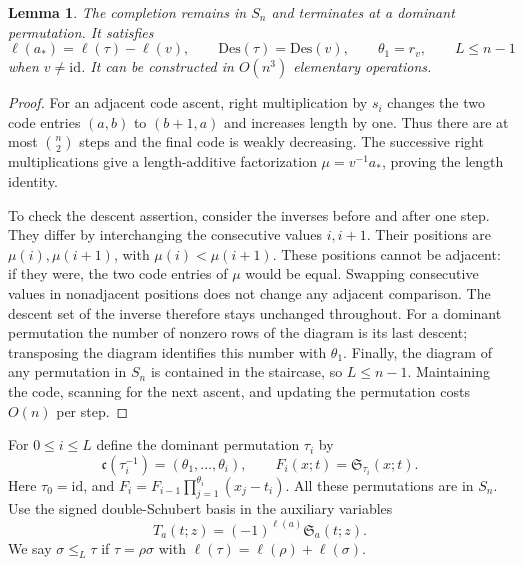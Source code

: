 \documentclass{amsart}
\newtheorem{lemma}[theorem]{Lemma}
\theoremstyle{definition}
\theoremstyle{remark}
\numberwithin{equation}{section}
\newcommand{\Sch}{\mathfrak S}
\newcommand{\code}{\mathfrak c}
\newcommand{\id}{\mathrm{id}}
\newcommand{\Des}{\mathrm{Des}}
\begin{document}
\begin{lemma}\label{lem:completion}
The completion remains in $S_n$ and terminates at a dominant permutation.
It satisfies
\[
 \ell(a_*)=\ell(\tau)-\ell(v),\qquad
 \Des(\tau)=\Des(v),\qquad
 \theta_1=r_v,\qquad L\leq n-1
\]
when $v\ne\id$.
It can be constructed in $O(n^3)$ elementary operations.
\end{lemma}
\begin{proof}
For an adjacent code ascent, right multiplication by $s_i$ changes
the two code entries $(a,b)$ to $(b+1,a)$ and increases length by one.
Thus there are at most $\binom n2$ steps and the final code is weakly
decreasing.
The successive right multiplications give a length-additive
factorization $\mu=v^{-1}a_*$, proving the length identity.

To check the descent assertion, consider the inverses before and after
one step. They differ by interchanging the consecutive values $i,i+1$.
Their positions are $\mu(i),\mu(i+1)$, with $\mu(i)<\mu(i+1)$.
These positions cannot be adjacent: if they were, the two code entries
of $\mu$ would be equal. Swapping consecutive values in nonadjacent
positions does not change any adjacent comparison.
The descent set of the inverse therefore stays unchanged throughout.
For a dominant permutation the number of nonzero rows of the diagram
is its last descent; transposing the diagram identifies this number
with $\theta_1$.
Finally, the diagram of any permutation in $S_n$ is contained in the
staircase, so $L\leq n-1$.
Maintaining the code, scanning for the next ascent, and updating the
permutation costs $O(n)$ per step.
\end{proof}

For $0\leq i\leq L$ define the dominant permutation $\tau_i$ by
\[
 \code(\tau_i^{-1})=(\theta_1,\ldots,\theta_i),\qquad
 F_i(x;t)=\Sch_{\tau_i}(x;t).
\]
Here $\tau_0=\id$, and
$F_i=F_{i-1}\prod_{j=1}^{\theta_i}(x_j-t_i)$.
All these permutations are in $S_n$.
Use the signed double-Schubert basis in the auxiliary variables
\[
 T_a(t;z)=(-1)^{\ell(a)}\Sch_a(t;z).
\]
We say $\sigma\leq_L\tau$ if $\tau=\rho\sigma$ with
$\ell(\tau)=\ell(\rho)+\ell(\sigma)$.
\end{document}

